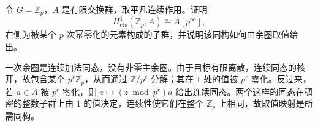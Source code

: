 \begin{exercise}\label{b4:ex:11-continuous-characters}
令 \(G=\mathbb Z_p\)，\(A\) 是有限交换群，取平凡连续作用。证明
\[
H_{\mathrm{cts}}^1(\mathbb Z_p,A)\cong A[p^\infty],
\]
右侧为被某个 \(p\) 次幂零化的元素构成的子群，并说明该同构如何由余圈取值给出。
\end{exercise}
\begin{solution}
一次余圈是连续加法同态，没有非零主余圈。由于目标有限离散，连续同态的核开，故包含某个 \(p^r\mathbb Z_p\)，从而通过 \(\mathbb Z/p^r\) 分解；其在 \(1\) 处的值被 \(p^r\) 零化。反过来，若 \(a\in A\) 被 \(p^r\) 零化，则 \(z\mapsto(z\bmod p^r)a\) 给出连续同态。两个这样的同态在稠密的整数子群上由 \(1\) 的值决定，连续性使它们在整个 \(\mathbb Z_p\) 上相同，故取值映射是所需同构。
\end{solution}
